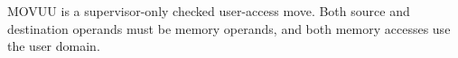 MOVUU is a supervisor-only checked user-access move. Both source and destination operands must be memory operands, and both memory accesses use the user domain.

